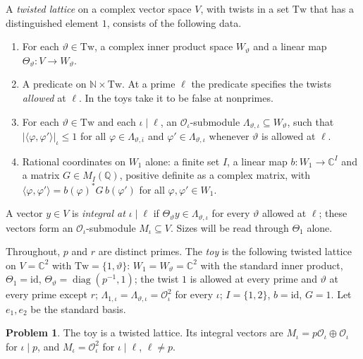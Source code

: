 \documentclass[reqno]{amsart}
\theoremstyle{definition}
\newtheorem{problem}{Problem}[section]
\theoremstyle{plain}
\theoremstyle{remark}
\newcommand{\Q}{\mathbb{Q}}
\newcommand{\C}{\mathbb{C}}
\newcommand{\Oc}{\mathcal{O}}
\newcommand{\diag}{\operatorname{diag}}
\begin{document}
A \emph{twisted lattice} on a complex vector space \(V\), with twists in a set \(\mathrm{Tw}\) that has a distinguished element \(1\), consists of the following data.
\begin{enumerate}
\item For each \(\vartheta \in \mathrm{Tw}\), a complex inner product space \(W_\vartheta\) and a linear map \(\Theta_\vartheta\colon V \to W_\vartheta\).
\item A predicate on \(\mathbb{N}\times\mathrm{Tw}\).  At a prime \(\ell\) the predicate specifies the twists \emph{allowed} at \(\ell\).  In the toys take it to be false at nonprimes.
\item For each \(\vartheta \in \mathrm{Tw}\) and each \(\iota \mid \ell\), an \(\Oc_\iota\)-submodule \(\Lambda_{\vartheta, \iota} \subseteq W_\vartheta\), such that \(\lvert \langle \varphi, \varphi' \rangle \rvert_\iota \le 1\) for all \(\varphi \in \Lambda_{\vartheta, \bar\iota}\) and \(\varphi' \in \Lambda_{\vartheta, \iota}\) whenever \(\vartheta\) is allowed at \(\ell\).
\item Rational coordinates on \(W_1\) alone: a finite set \(I\), a linear map \(b\colon W_1 \to \C^I\) and a matrix \(G \in M_I(\Q)\), positive definite as a complex matrix, with \(\langle \varphi, \varphi' \rangle = b(\varphi)^* G\, b(\varphi')\) for all \(\varphi, \varphi' \in W_1\).
\end{enumerate}
A vector \(y \in V\) is \emph{integral at \(\iota \mid \ell\)} if \(\Theta_\vartheta y \in \Lambda_{\vartheta, \iota}\) for every \(\vartheta\) allowed at \(\ell\); these vectors form an \(\Oc_\iota\)-submodule \(M_\iota \subseteq V\).  Sizes will be read through \(\Theta_1\) alone.

Throughout, \(p\) and \(r\) are distinct primes.  The \emph{toy} is the following twisted lattice on \(V = \C^2\) with \(\mathrm{Tw} = \{1, \vartheta\}\): \(W_1 = W_\vartheta = \C^2\) with the standard inner product, \(\Theta_1 = \mathrm{id}\), \(\Theta_\vartheta = \diag(p^{-1}, 1)\); the twist \(1\) is allowed at every prime and \(\vartheta\) at every prime except \(r\); \(\Lambda_{1, \iota} = \Lambda_{\vartheta, \iota} = \Oc_\iota^2\) for every \(\iota\); \(I = \{1, 2\}\), \(b = \mathrm{id}\), \(G = 1\).  Let \(e_1, e_2\) be the standard basis.

\begin{problem}\label{pr:toy-lattice}
The toy is a twisted lattice.  Its integral vectors are \(M_\iota = p\Oc_\iota \oplus \Oc_\iota\) for \(\iota \mid p\), and \(M_\iota = \Oc_\iota^2\) for \(\iota \mid \ell\), \(\ell \ne p\).
\end{problem}
\end{document}
